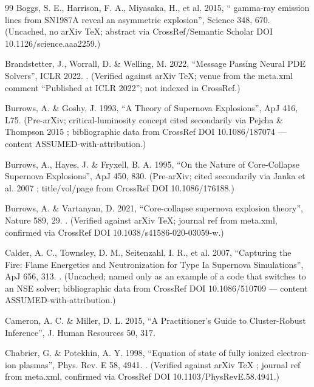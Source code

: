 \begin{thebibliography}{99}
Boggs, S. E., Harrison, F. A., Miyasaka, H., et al. 2015, `` gamma-ray emission lines from SN1987A reveal an asymmetric explosion'', Science 348, 670. (Uncached, no arXiv TeX; abstract via CrossRef/Semantic Scholar DOI 10.1126/science.aaa2259.)

Brandstetter, J., Worrall, D. \& Welling, M. 2022, ``Message Passing Neural PDE Solvers'', ICLR 2022. . (Verified against arXiv TeX; venue from the meta.xml comment ``Published at ICLR 2022''; not indexed in CrossRef.)

Burrows, A. \& Goshy, J. 1993, ``A Theory of Supernova Explosions'', ApJ 416, L75. (Pre-arXiv; critical-luminosity concept cited secondarily via Pejcha \& Thompson 2015 ; bibliographic data from CrossRef DOI 10.1086/187074 --- content ASSUMED-with-attribution.)

Burrows, A., Hayes, J. \& Fryxell, B. A. 1995, ``On the Nature of Core-Collapse Supernova Explosions'', ApJ 450, 830. (Pre-arXiv; cited secondarily via Janka et al. 2007 ; title/vol/page from CrossRef DOI 10.1086/176188.)

Burrows, A. \& Vartanyan, D. 2021, ``Core-collapse supernova explosion theory'', Nature 589, 29. . (Verified against arXiv TeX; journal ref from meta.xml, confirmed via CrossRef DOI 10.1038/s41586-020-03059-w.)

Calder, A. C., Townsley, D. M., Seitenzahl, I. R., et al. 2007, ``Capturing the Fire: Flame Energetics and Neutronization for Type Ia Supernova Simulations'', ApJ 656, 313. . (Uncached; named only as an example of a code that switches to an NSE solver; bibliographic data from CrossRef DOI 10.1086/510709 --- content ASSUMED-with-attribution.)

Cameron, A. C. \& Miller, D. L. 2015, ``A Practitioner's Guide to Cluster-Robust Inference'', J. Human Resources 50, 317.

Chabrier, G. \& Potekhin, A. Y. 1998, ``Equation of state of fully ionized electron-ion plasmas'', Phys. Rev. E 58, 4941. . (Verified against arXiv TeX ; journal ref from meta.xml, confirmed via CrossRef DOI 10.1103/PhysRevE.58.4941.)


\end{thebibliography}
